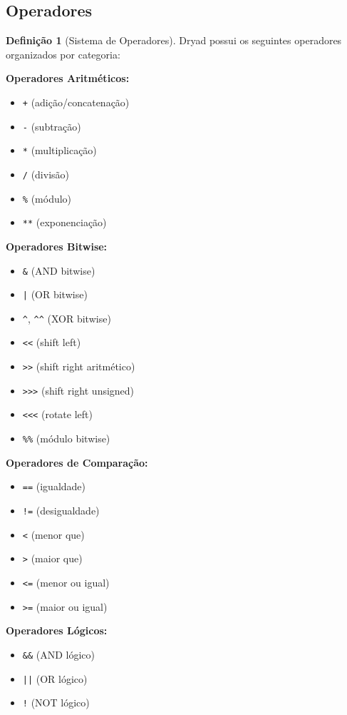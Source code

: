 \documentclass[12pt,a4paper]{article}
\theoremstyle{definition}
\newtheorem{definition}{Definição}[section]
\begin{document}
\subsection{Operadores}

\begin{definition}[Sistema de Operadores]
Dryad possui os seguintes operadores organizados por categoria:

\textbf{Operadores Aritméticos:}
\begin{itemize}[noitemsep]
    \item \texttt{+} (adição/concatenação)
    \item \texttt{-} (subtração)
    \item \texttt{*} (multiplicação)
    \item \texttt{/} (divisão)
    \item \texttt{\%} (módulo)
    \item \texttt{**} (exponenciação)
\end{itemize}

\textbf{Operadores Bitwise:}
\begin{itemize}[noitemsep]
    \item \texttt{\&} (AND bitwise)
    \item \texttt{|} (OR bitwise)
    \item \texttt{\textasciicircum}, \texttt{\textasciicircum\textasciicircum} (XOR bitwise)
    \item \texttt{<<} (shift left)
    \item \texttt{>>} (shift right aritmético)
    \item \texttt{>>>} (shift right unsigned)
    \item \texttt{<<<} (rotate left)
    \item \texttt{\%\%} (módulo bitwise)
\end{itemize}

\textbf{Operadores de Comparação:}
\begin{itemize}[noitemsep]
    \item \texttt{==} (igualdade)
    \item \texttt{!=} (desigualdade)
    \item \texttt{<} (menor que)
    \item \texttt{>} (maior que)
    \item \texttt{<=} (menor ou igual)
    \item \texttt{>=} (maior ou igual)
\end{itemize}

\textbf{Operadores Lógicos:}
\begin{itemize}[noitemsep]
    \item \texttt{\&\&} (AND lógico)
    \item \texttt{||} (OR lógico)
    \item \texttt{!} (NOT lógico)
\end{itemize}


\end{definition}
\end{document}
